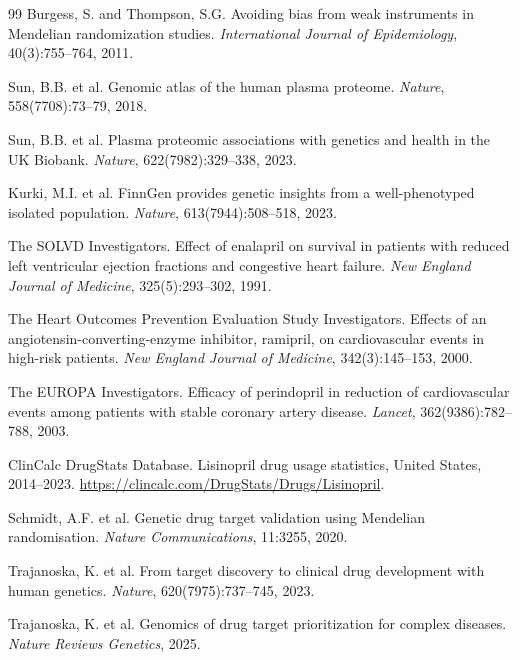\documentclass[11pt]{article}
\begin{document}
\begin{thebibliography}{99}
Burgess, S. and Thompson, S.G.
\newblock Avoiding bias from weak instruments in Mendelian randomization studies.
\newblock \emph{International Journal of Epidemiology}, 40(3):755--764, 2011.

Sun, B.B. et al.
\newblock Genomic atlas of the human plasma proteome.
\newblock \emph{Nature}, 558(7708):73--79, 2018.

Sun, B.B. et al.
\newblock Plasma proteomic associations with genetics and health in the UK Biobank.
\newblock \emph{Nature}, 622(7982):329--338, 2023.

Kurki, M.I. et al.
\newblock FinnGen provides genetic insights from a well-phenotyped isolated population.
\newblock \emph{Nature}, 613(7944):508--518, 2023.

The SOLVD Investigators.
\newblock Effect of enalapril on survival in patients with reduced left ventricular ejection fractions and congestive heart failure.
\newblock \emph{New England Journal of Medicine}, 325(5):293--302, 1991.

The Heart Outcomes Prevention Evaluation Study Investigators.
\newblock Effects of an angiotensin-converting-enzyme inhibitor, ramipril, on cardiovascular events in high-risk patients.
\newblock \emph{New England Journal of Medicine}, 342(3):145--153, 2000.

The EUROPA Investigators.
\newblock Efficacy of perindopril in reduction of cardiovascular events among patients with stable coronary artery disease.
\newblock \emph{Lancet}, 362(9386):782--788, 2003.

ClinCalc DrugStats Database.
\newblock Lisinopril drug usage statistics, United States, 2014--2023.
\newblock \url{https://clincalc.com/DrugStats/Drugs/Lisinopril}.

Schmidt, A.F. et al.
\newblock Genetic drug target validation using Mendelian randomisation.
\newblock \emph{Nature Communications}, 11:3255, 2020.

Trajanoska, K. et al.
\newblock From target discovery to clinical drug development with human genetics.
\newblock \emph{Nature}, 620(7975):737--745, 2023.

Trajanoska, K. et al.
\newblock Genomics of drug target prioritization for complex diseases.
\newblock \emph{Nature Reviews Genetics}, 2025.


\end{thebibliography}
\end{document}
